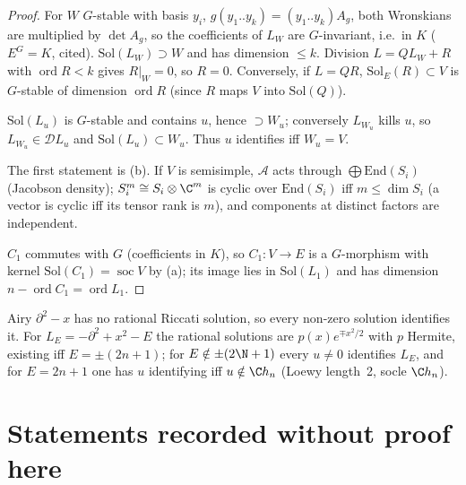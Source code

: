 \begin{proof}
For $W$ $G$-stable with basis $y_i$, $g(y_1..y_k)=(y_1..y_k)A_g$, both Wronskians are multiplied by $\det A_g$, so the coefficients of $L_W$ are $G$-invariant, i.e.\ in $K$ ($E^G=K$, cited). $\mathrm{Sol}(L_W)\supset W$ and has dimension $\le k$. Division $L=QL_W+R$ with $\operatorname{ord}R<k$ gives $R|_W=0$, so $R=0$. Conversely, if $L=QR$, $\mathrm{Sol}_E(R)\subset V$ is $G$-stable of dimension $\operatorname{ord}R$ (since $R$ maps $V$ into $\mathrm{Sol}(Q)$).

$\mathrm{Sol}(L_u)$ is $G$-stable and contains $u$, hence $\supset W_u$; conversely $L_{W_u}$ kills $u$, so $L_{W_u}\in\mathcal DL_u$ and $\mathrm{Sol}(L_u)\subset W_u$. Thus $u$ identifies iff $W_u=V$.

The first statement is (b). If $V$ is semisimple, $\mathcal A$ acts through $\bigoplus\mathrm{End}(S_i)$ (Jacobson density); $S_i^{m}\cong S_i\otimes\C^m$ is cyclic over $\mathrm{End}(S_i)$ iff $m\le\dim S_i$ (a vector is cyclic iff its tensor rank is $m$), and components at distinct factors are independent.

$C_1$ commutes with $G$ (coefficients in $K$), so $C_1:V\to E$ is a $G$-morphism with kernel $\mathrm{Sol}(C_1)=\operatorname{soc}V$ by (a); its image lies in $\mathrm{Sol}(L_1)$ and has dimension $n-\operatorname{ord}C_1=\operatorname{ord}L_1$.

\end{proof}

\begin{caution}[title={Examples that follow}]
Airy $\partial^2-x$ has no rational Riccati solution, so every non-zero solution identifies it. For $L_E=-\partial^2+x^2-E$ the rational solutions are $p(x)e^{\mp x^2/2}$ with $p$ Hermite, existing iff $E=\pm(2n+1)$; for $E\notin\pm(2\N+1)$ every $u\ne0$ identifies $L_E$, and for $E=2n+1$ one has $u$ identifying iff $u\notin\C h_n$ (Loewy length~2, socle $\C h_n$).
\end{caution}

\section{Statements recorded without proof here}

